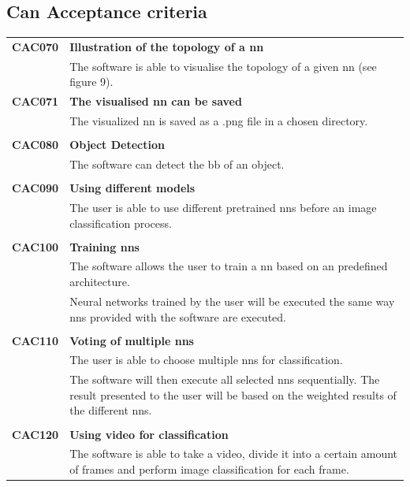 \documentclass[parskip=full]{scrartcl}
\begin{document}
\subsection{Can Acceptance criteria}
\begin{tabular}{p{2cm}p{11.4cm}}
\textbf{CAC070} \hypertarget{CAC070} & \textbf{Illustration of the topology of a \gls{nn}} \\
& The software is able to visualise the topology of a given \gls{nn} (see figure 9). \\
\textbf{CAC071} \hypertarget{CAC071} & \textbf{The visualised \gls{nn} can be saved}\\
& The visualized \gls{nn} is saved as a .png file in a chosen directory.\\
& \\
\textbf{CAC080} \hypertarget{CAC080} & \textbf{Object Detection} \\
& The software can detect the \gls{bb} of an object. \\ 
& \\
\textbf{CAC090} \hypertarget{CAC090} &  \textbf{Using different models}\\
& The user is able to use different pretrained \glspl{nn} before an \gls{image classification} process. \\
& \\
\textbf{CAC100} \hypertarget{CAC100} & \textbf{Training \glspl{nn}} \\
& The software allows the user to train a \gls{nn} based on an predefined architecture.\\
& Neural networks trained by the user will be executed the same way \glspl{nn} provided with the software are executed.\\
& \\
\textbf{CAC110} \hypertarget{CAC110} & \textbf{Voting of multiple \glspl{nn}} \\
& The user is able to choose multiple \glspl{nn} for classification.\\
& The software will then execute all selected \glspl{nn} sequentially. The result presented to the user will be based on the weighted results of the different \glspl{nn}.\\
& \\
\textbf{CAC120} \hypertarget{CAC120} & \textbf{Using video for classification} \\
& The software is able to take a video, divide it into a certain amount of frames and perform \gls{image classification} for each frame.\\

\end{tabular}
\end{document}
